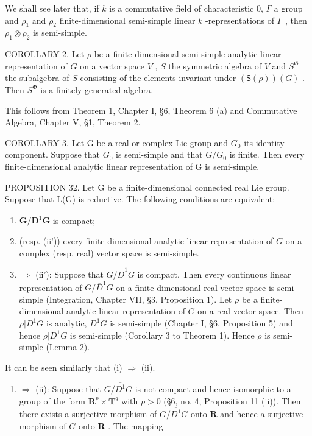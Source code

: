 We shall see later that, if \(k\) is a commutative field of characteristic 0, \(\Gamma\) a group and \(\rho_1\) and \(\rho_2\) finite-dimensional semi-simple linear \(k\) -representations of \(\Gamma\) , then \(\rho_1 \otimes \rho_2\) is semi-simple.

COROLLARY 2. Let \(\rho\) be a finite-dimensional semi-simple analytic linear representation of \(G\) on a vector space \(V\) , \(S\) the symmetric algebra of \(V\) and \(S^{\mathfrak{G}}\) the subalgebra of \(S\) consisting of the elements invariant under \((\mathsf{S}(\rho))(G)\) . Then \(S^{\mathfrak{G}}\) is a finitely generated algebra.

This follows from Theorem 1, Chapter I, §6, Theorem 6 (a) and Commutative Algebra, Chapter V, §1, Theorem 2.

COROLLARY 3. Let G be a real or complex Lie group and \(G_{0}\) its identity component. Suppose that \(G_{0}\) is semi-simple and that \(G/G_{0}\) is finite. Then every finite-dimensional analytic linear representation of G is semi-simple.

PROPOSITION 32. Let G be a finite-dimensional connected real Lie group. Suppose that L(G) is reductive. The following conditions are equivalent:

\begin{enumerate}
\def\labelenumi{(\roman{enumi})}
\item
  \(\mathbf{G} / \overline{\mathbf{D}^1}\mathbf{G}\) is compact;
\item
  (resp. (ii')) every finite-dimensional analytic linear representation of \(G\) on a complex (resp. real) vector space is semi-simple.
\item
  \(\Rightarrow\) (ii'): Suppose that \(G / \overline{D}^1 G\) is compact. Then every continuous linear representation of \(G / \overline{D}^1 G\) on a finite-dimensional real vector space is semi-simple (Integration, Chapter VII, §3, Proposition 1). Let \(\rho\) be a finite-dimensional analytic linear representation of \(G\) on a real vector space. Then \(\rho |D^1 G\) is analytic, \(D^1 G\) is semi-simple (Chapter I, §6, Proposition 5) and hence \(\rho |D^1 G\) is semi-simple (Corollary 3 to Theorem 1). Hence \(\rho\) is semi-simple (Lemma 2).
\end{enumerate}

It can be seen similarly that (i) \(\Rightarrow\) (ii).

\begin{enumerate}
\def\labelenumi{(\roman{enumi})}
\tightlist
\item
  \(\Rightarrow\) (ii): Suppose that \(G / \overline{D^1} G\) is not compact and hence isomorphic to a group of the form \(\mathbf{R}^p\times \mathbf{T}^q\) with \(p > 0\) (§6, no. 4, Proposition 11 (ii)). Then there exists a surjective morphism of \(G / \overline{D^1} G\) onto \(\mathbf{R}\) and hence a surjective morphism of \(G\) onto \(\mathbf{R}\) . The mapping
\end{enumerate}

